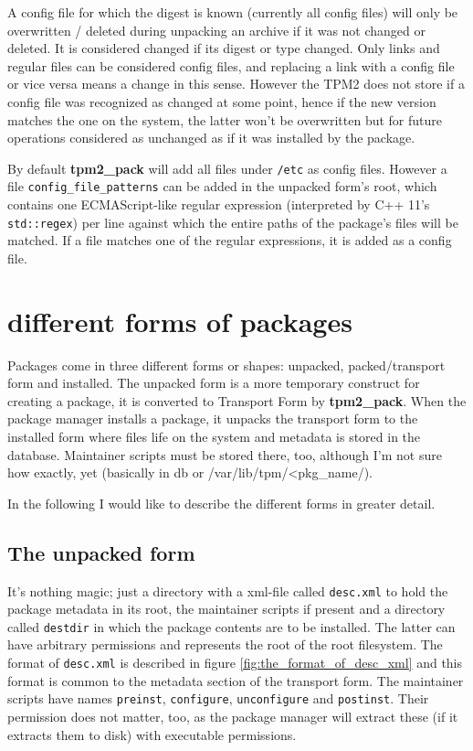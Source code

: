 \documentclass[a4paper]{scrartcl}
\newcommand{\file}[1]{\texttt{#1}}
\newcommand{\program}[1]{\textbf{#1}}
\begin{document}
	A config file for which the digest is known (currently all config files) will only be overwritten / deleted during unpacking an archive if it was not changed or deleted. It is considered changed if its digest or type changed. Only links and regular files can be considered config files, and replacing a link with a config file or vice versa means a change in this sense. However the TPM2 does not store if a config file was recognized as changed at some point, hence if the new version matches the one on the system, the latter won't be overwritten but for future operations considered as unchanged as if it was installed by the package.
	
	By default \program{tpm2\_pack} will add all files under \file{/etc} as config files. However a file \file{config\_file\_patterns} can be added in the unpacked form's root, which contains one ECMAScript-like regular expression (interpreted by C++ 11's \texttt{std::regex}) per line against which the entire paths of the package's files will be matched. If a file matches one of the regular expressions, it is added as a config file.
	
	
	\section{different forms of packages}
	\label{sec:differnt_forms_of_packages}
	
	Packages come in three different forms or shapes: unpacked, packed/transport form and installed. The unpacked form is a more temporary construct for creating a package, it is converted to Transport Form by \program{tpm2\_pack}. When the package manager installs a package, it unpacks the transport form to the installed form where files life on the system and metadata is stored in the database. Maintainer scripts must be stored there, too, although I'm not sure how exactly, yet (basically in db or /var/lib/tpm/<pkg\_name/).
	
	In the following I would like to describe the different forms in greater detail.
	
	
	\subsection{The unpacked form}
	\label{ssec:the_unpacked_form}
	
	It's nothing magic; just a directory with a xml-file called \file{desc.xml} to hold the package metadata in its root, the maintainer scripts if present and a directory called \file{destdir} in which the package contents are to be installed. The latter can have arbitrary permissions and represents the root of the root filesystem. The format of \file{desc.xml} is described in figure \ref{fig:the_format_of_desc_xml} and this format is common to the metadata section of the transport form. The maintainer scripts have names \file{preinst}, \file{configure}, \file{unconfigure} and \file{postinst}. Their permission does not matter, too, as the package manager will extract these (if it extracts them to disk) with executable permissions.
	
\end{document}
